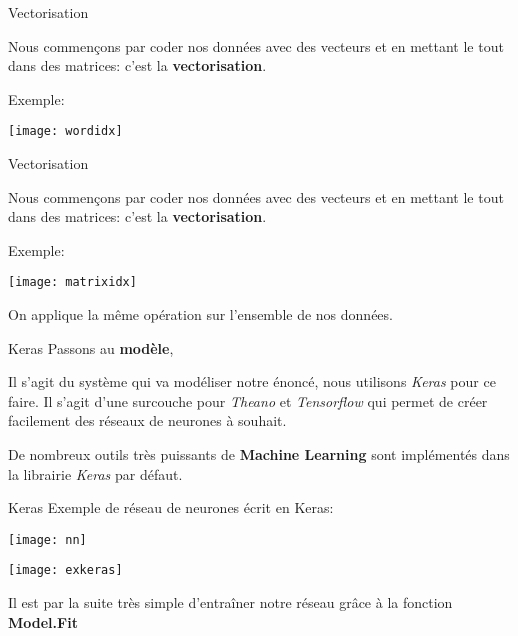 \documentclass{beamer}
\theoremstyle{definition}
\begin{document}
\begin{frame}{Vectorisation}

Nous commençons par coder nos données avec des vecteurs et en mettant le tout dans des matrices: c'est la \textbf{vectorisation}.

\vspace{0.5cm}

Exemple:

\center\texttt{[image: wordidx]}

\end{frame}

\begin{frame}{Vectorisation}

Nous commençons par coder nos données avec des vecteurs et en mettant le tout dans des matrices: c'est la \textbf{vectorisation}.

\vspace{0.5cm}

Exemple:

\center\texttt{[image: matrixidx]}

On applique la même opération sur l'ensemble de nos données.

\end{frame}

\begin{frame}{Keras}
Passons au \textbf{modèle},

\vspace{0.5cm}

Il s'agit du système qui va modéliser notre énoncé, nous utilisons \textit{Keras} pour ce faire. Il s'agit d'une surcouche pour \textit{Theano} et \textit{Tensorflow} qui permet de créer facilement des réseaux de neurones à souhait.

\vspace{0.5cm}

De nombreux outils très puissants de \textbf{Machine Learning} sont implémentés dans la librairie \textit{Keras} par défaut.
\end{frame}
\begin{frame}{Keras}
Exemple de réseau de neurones écrit en Keras:
\begin{minipage}[c]{.46\linewidth}
\texttt{[image: nn]}
\end{minipage}
\begin{minipage}[c]{.46\linewidth}
\texttt{[image: exkeras]}
\end{minipage}
\vspace{1cm}

Il est par la suite très simple d'entraîner notre réseau grâce à la fonction \textbf{Model.Fit}
\end{frame}
\end{document}
